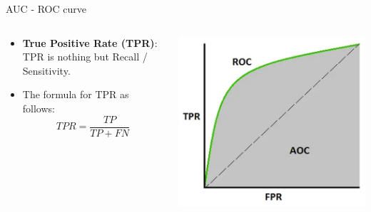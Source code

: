 \documentclass[11pt]{beamer}
\begin{document}
\begin{frame}{AUC - ROC curve}
\begin{columns}[T] %
\begin{column}{.48\textwidth}
        \begin{itemize}
		\item \textbf{True Positive Rate (TPR)}: TPR is nothing but Recall / Sensitivity. 
		\item The formula for TPR as follows: $$TPR=\frac{TP}{TP+FN}$$
        \end{itemize}
\end{column}%
\hfill%
\begin{column}{.48\textwidth}
        \includegraphics[width=\linewidth]{../05-pictures/lesson-4-1_pic_2.png}
\end{column}%
\end{columns}
\end{frame}
\end{document}
